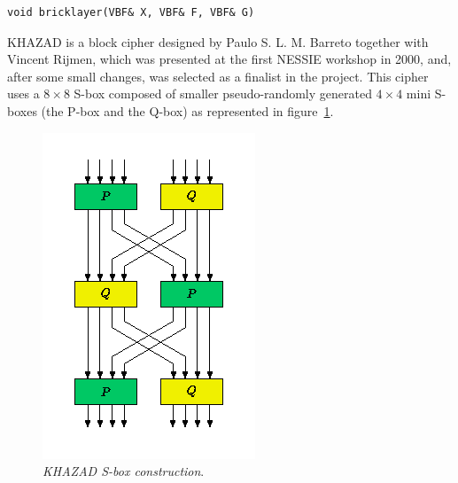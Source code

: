 \begin{verbatim}
void bricklayer(VBF& X, VBF& F, VBF& G)  
\end{verbatim}

\begin{example}
KHAZAD is a block cipher designed by Paulo S. L. M. Barreto together with Vincent Rijmen, which was presented at the first NESSIE workshop in 2000, and, after some small changes, was selected as a finalist in the project. This cipher uses a $8 \times 8$ S-box composed of smaller pseudo-randomly generated $4 \times 4$  mini S-boxes (the P-box and the Q-box) as represented in figure~\ref{fig:KHAZADS}.

\begin{figure}[htbp!]
\centering
\includegraphics[width=\textwidth]{KHAZADS}
\caption[KHAZAD S-box construction]{\textit{KHAZAD S-box construction}.}
\label{fig:KHAZADS}
\end{figure}


\end{example}
